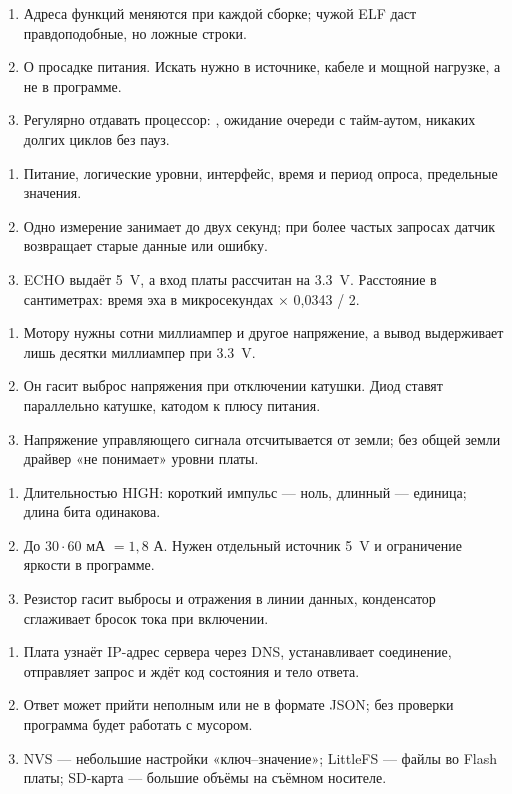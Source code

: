 \begin{enumerate}
  \item Адреса функций меняются при каждой сборке; чужой ELF даст правдоподобные, но ложные строки.
  \item О просадке питания. Искать нужно в источнике, кабеле и мощной нагрузке, а не в программе.
  \item Регулярно отдавать процессор: , ожидание очереди с тайм-аутом, никаких долгих циклов без пауз.
\end{enumerate}

\begin{enumerate}
  \item Питание, логические уровни, интерфейс, время и период опроса, предельные значения.
  \item Одно измерение занимает до двух секунд; при более частых запросах датчик возвращает старые данные или ошибку.
  \item ECHO выдаёт \SI{5}{V}, а вход платы рассчитан на \SI{3.3}{V}. Расстояние в сантиметрах: время эха в микросекундах × 0,0343 / 2.
\end{enumerate}

\begin{enumerate}
  \item Мотору нужны сотни миллиампер и другое напряжение, а вывод выдерживает лишь десятки миллиампер при \SI{3.3}{V}.
  \item Он гасит выброс напряжения при отключении катушки. Диод ставят параллельно катушке, катодом к плюсу питания.
  \item Напряжение управляющего сигнала отсчитывается от земли; без общей земли драйвер «не понимает» уровни платы.
\end{enumerate}

\begin{enumerate}
  \item Длительностью HIGH: короткий импульс --- ноль, длинный --- единица; длина бита одинакова.
  \item До $30 \cdot 60$ мА $= 1{,}8$ А. Нужен отдельный источник \SI{5}{V} и ограничение яркости в программе.
  \item Резистор гасит выбросы и отражения в линии данных, конденсатор сглаживает бросок тока при включении.
\end{enumerate}

\begin{enumerate}
  \item Плата узнаёт IP-адрес сервера через DNS, устанавливает соединение, отправляет запрос и ждёт код состояния и тело ответа.
  \item Ответ может прийти неполным или не в формате JSON; без проверки программа будет работать с мусором.
  \item NVS --- небольшие настройки «ключ--значение»; LittleFS --- файлы во Flash платы; SD-карта --- большие объёмы на съёмном носителе.
\end{enumerate}

